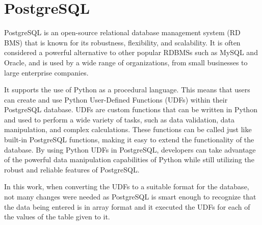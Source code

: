 \section{PostgreSQL}
\label{sec:postgres}


PostgreSQL is an open-source relational database management system (RD BMS) that is known for its robustness, flexibility, and scalability. It is often considered a powerful alternative to other popular RDBMSs such as MySQL and Oracle, and is used by a wide range of organizations, from small businesses to large enterprise companies.

It supports the use of Python as a procedural language. This means that users can create and use Python User-Defined Functions (UDFs) within their PostgreSQL database. UDFs are custom functions that can be written in Python and used to perform a wide variety of tasks, such as data validation, data manipulation, and complex calculations. These functions can be called just like built-in PostgreSQL functions, making it easy to extend the functionality of the database. By using Python UDFs in PostgreSQL, developers can take advantage of the powerful data manipulation capabilities of Python while still utilizing the robust and reliable features of PostgreSQL.

In this work, when converting the UDFs to a suitable format for the database, not many changes were needed as PostgreSQL is smart enough to recognize that the data being entered is in array format and it executed the UDFs for each of the values of the table given to it.